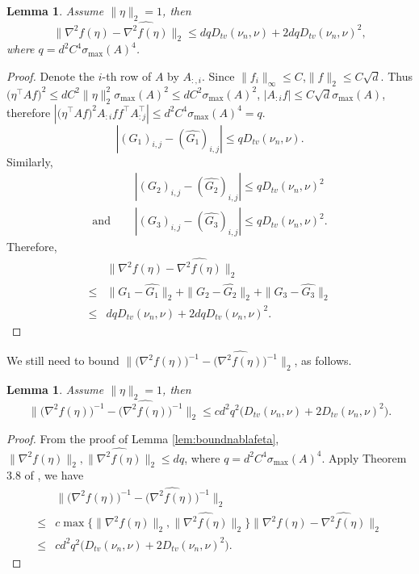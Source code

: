 \documentclass[english]{article} %
\providecommand{\lemmaname}{Lemma}
\providecommand{\lemmaname}{Lemma}
\theoremstyle{plain}
\theoremstyle{remark}
\theoremstyle{claim}
\theoremstyle{plain}
\newtheorem{lemma}[thm]{\protect\lemmaname}
\begin{document}
\begin{lemma}
\label{lem:nablavariation}
Assume $\|\eta\|_2 = 1$, then 
\[
\|\nabla^2 f(\eta) - \widehat{\nabla^2 f(\eta)}  \|_2 \le d q D_{tv}(\nu_n , \nu) + 2dq D_{tv}(\nu_n , \nu)^2,
\]
where $q = d^2C^4\sigma_{\max}(A)^4$.
\end{lemma}
\begin{proof}
Denote the $i$-th row of $A$ by $A_{:,i}$. Since $\|f_i\|_\infty \le C$,$\|f\|_2 \le C\sqrt{d}$. 
Thus $\big(\eta^{\top}Af\big)^2 \le d C^2\|\eta\|_2^2\sigma_{\max}(A)^2 \le d C^2\sigma_{\max}(A)^2 $,  $|A_{:i}f| \le C\sqrt{d}\sigma_{\max}(A)$, 
therefore $|\big(\eta^{\top}Af\big)^2 A_{:i}ff^{\top} A_{:j}^{\top}| \le d^2C^4\sigma_{\max}(A)^4 = q$.
\[
|(G_1)_{i,j} - (\widehat{G_1})_{i,j} | \le q D_{tv}(\nu_n , \nu).
\]
Similarly, 
\begin{align*}
& |(G_2)_{i,j} - (\widehat{G_2})_{i,j} | \le q D_{tv}(\nu_n , \nu)^2 \\
\text{and } \quad & |(G_3)_{i,j} - (\widehat{G_3})_{i,j} | \le q D_{tv}(\nu_n , \nu)^2.
\end{align*}
Therefore,
\begin{align*}
	& \|\nabla^2 f(\eta) - \widehat{\nabla^2 f(\eta)}  \|_2 \\
\le & \|G_1 - \widehat{G_1}\|_2 + \|G_2 - \widehat{G_2}\|_2 + \|G_3 - \widehat{G_3}\|_2 \\
\le & d q D_{tv}(\nu_n , \nu) + 2dq D_{tv}(\nu_n , \nu)^2.
\end{align*}
\end{proof}

We still need to bound $\|\big(\nabla^2 f(\eta)\big)^{-1} - \big(\widehat{\nabla^2 f(\eta)}\big)^{-1}  \|_2 $, as follows.
\begin{lemma}
Assume $\|\eta\|_2 = 1$, then 
\[
\|\big(\nabla^2 f(\eta)\big)^{-1} - \big(\widehat{\nabla^2 f(\eta)}\big)^{-1}  \|_2 \le cd^2q^2\big(D_{tv}(\nu_n , \nu) + 2D_{tv}(\nu_n , \nu)^2\big).
\]
\end{lemma}
\begin{proof}
From the proof of Lemma \ref{lem:boundnablafeta}, $\|\nabla^2 f(\eta)\|_2, \|\widehat{\nabla^2 f(\eta)}\|_2 \le dq$, where $q = d^2C^4\sigma_{\max}(A)^4$.
Apply Theorem 3.8 of \citep*{stewart1990matrix}, we have 
\begin{align*}
& \|\big(\nabla^2 f(\eta)\big)^{-1} - \big(\widehat{\nabla^2 f(\eta)}\big)^{-1}  \|_2 \\
\le & c\max\{\|\nabla^2 f(\eta)\|_2, \|\widehat{\nabla^2 f(\eta)}\|_2\} \|\nabla^2 f(\eta) - \widehat{\nabla^2 f(\eta)}\|_2 \\
\le & cd^2q^2\big(D_{tv}(\nu_n , \nu) + 2D_{tv}(\nu_n , \nu)^2\big).
\end{align*}

\end{proof}
\fi
\end{document}
